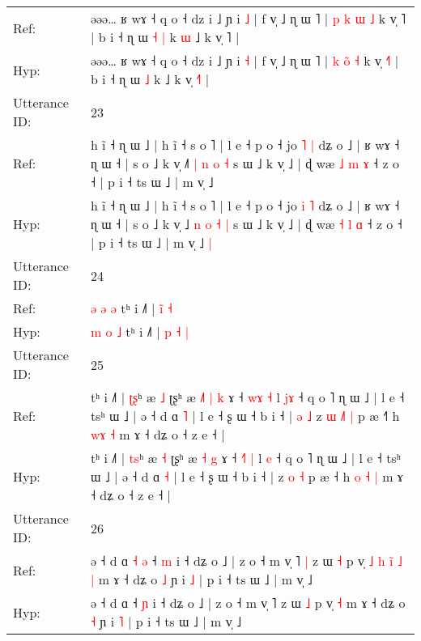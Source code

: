 \documentclass[10pt]{article}
\DeclareRobustCommand{\hl}[1]{{\textcolor{red}{#1}}}
\begin{document}
\begin{longtable}{ll}
Ref: & əəə… ʁ wɤ ˧ q o ˧ dz i ˩ ɲ i \hl{˩} | f v̩ ˩ ɳ ɯ ˥ | \hl{p} \hl{k}\hl{ }\hl{ɯ} \hl{˩} k v̩ \hl{}˥ | b i ˧ ɳ ɯ\hl{ }\hl{˧} \hl{|} k\hl{ }\hl{ɯ} ˩ k v̩ \hl{}˥ |
 \\
Hyp: & əəə… ʁ wɤ ˧ q o ˧ dz i ˩ ɲ i \hl{˧} | f v̩ ˩ ɳ ɯ ˥ | \hl{k} \hl{}\hl{o}\hl{̃} \hl{˧} k v̩ \hl{˧}˥ | b i ˧ ɳ ɯ\hl{}\hl{} \hl{˩} k\hl{}\hl{} ˩ k v̩ \hl{˧}˥ |
 \\
\midrule
Utterance ID: & 23 \\
Ref: & h ĩ ˧ ɳ ɯ ˩ | h ĩ ˧ s o ˥ | l e ˧ p o ˧ jo \hl{˥} \hl{|} dʑ o ˩ | ʁ wɤ ˧ ɳ ɯ ˧ | s o ˩ k v̩ ˩\hl{˥} \hl{|} \hl{n} \hl{o} \hl{˧} s ɯ ˩ k v̩ ˩ | ɖ wæ \hl{˩} \hl{m} \hl{ɤ} ˧ z o ˧ | p i ˧ ts ɯ ˩ | m v̩ ˩\hl{}\hl{}
 \\
Hyp: & h ĩ ˧ ɳ ɯ ˩ | h ĩ ˧ s o ˥ | l e ˧ p o ˧ jo \hl{i} \hl{˥} dʑ o ˩ | ʁ wɤ ˧ ɳ ɯ ˧ | s o ˩ k v̩ ˩\hl{} \hl{n} \hl{o} \hl{˧} \hl{|} s ɯ ˩ k v̩ ˩ | ɖ wæ \hl{˧} \hl{l} \hl{ɑ} ˧ z o ˧ | p i ˧ ts ɯ ˩ | m v̩ ˩\hl{ }\hl{|}
 \\
\midrule
Utterance ID: & 24 \\
Ref: & \hl{ə} \hl{ə} \hl{ə} tʰ i ˩˥ | \hl{}\hl{i}\hl{̃} \hl{˧}
 \\
Hyp: & \hl{m} \hl{o} \hl{˩} tʰ i ˩˥ | \hl{p}\hl{ }\hl{˧} \hl{|}
 \\
\midrule
Utterance ID: & 25 \\
Ref: & tʰ i ˩˥ | \hl{ʈ}\hl{ʂ}ʰ æ \hl{˩} ʈʂʰ æ\hl{ }\hl{˩}\hl{˥} \hl{|} \hl{k} ɤ ˧ \hl{w}\hl{ɤ} \hl{˧} l \hl{j}\hl{ɤ} ˧ q o ˥ ɳ ɯ ˩ | l e ˧ tsʰ ɯ ˩ | ə ˧ d ɑ \hl{˥} | l e ˧ ʂ ɯ ˧ b i ˧ |\hl{ }\hl{ə}\hl{ }\hl{˩} z\hl{ }\hl{ɯ} \hl{˩}\hl{˥} \hl{|} p æ ˧\hl{˥} h \hl{}\hl{w}\hl{ɤ} \hl{˧} m ɤ ˧ dʑ o ˧ z e ˧ |
 \\
Hyp: & tʰ i ˩˥ | \hl{t}\hl{s}ʰ æ \hl{˧} ʈʂʰ æ\hl{}\hl{}\hl{} \hl{˧} \hl{g} ɤ ˧ \hl{˧}\hl{˥} \hl{|} l \hl{}\hl{e} ˧ q o ˥ ɳ ɯ ˩ | l e ˧ tsʰ ɯ ˩ | ə ˧ d ɑ \hl{˧} | l e ˧ ʂ ɯ ˧ b i ˧ |\hl{}\hl{}\hl{}\hl{} z\hl{}\hl{} \hl{}\hl{o} \hl{˧} p æ ˧\hl{} h \hl{o}\hl{ }\hl{˧} \hl{|} m ɤ ˧ dʑ o ˧ z e ˧ |
 \\
\midrule
Utterance ID: & 26 \\
Ref: & ə ˧ d ɑ\hl{ }\hl{˧}\hl{ }\hl{ə} ˧ \hl{m} i ˧ dʑ o ˩ | z o ˧ m v̩ ˥\hl{ }\hl{|} z ɯ \hl{˧} p v̩\hl{ }\hl{˩}\hl{ }\hl{h}\hl{ }\hl{i}\hl{̃}\hl{ }\hl{˩} \hl{|} m ɤ ˧ dʑ o \hl{˩} ɲ i \hl{˩} | p i ˧ ts ɯ ˩ | m v̩ ˩
 \\
Hyp: & ə ˧ d ɑ\hl{}\hl{}\hl{}\hl{} ˧ \hl{ɲ} i ˧ dʑ o ˩ | z o ˧ m v̩ ˥\hl{}\hl{} z ɯ \hl{˩} p v̩\hl{}\hl{}\hl{}\hl{}\hl{}\hl{}\hl{}\hl{}\hl{} \hl{˧} m ɤ ˧ dʑ o \hl{˧} ɲ i \hl{˥} | p i ˧ ts ɯ ˩ | m v̩ ˩
 \\

\end{longtable}
\end{document}
